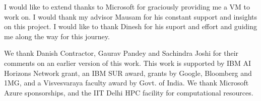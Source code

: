 I would like to extend thanks to Microsoft for graciously providing me a VM to work on.
I would thank my advisor Mausam for his constant support and insights on this project. 
I would like to thank Dinesh for his suport and effort and guiding me along the way for this journey.

We thank Danish Contractor, Gaurav Pandey and Sachindra Joshi for their comments on an earlier version of this work.  This work is supported by IBM AI Horizons Network grant, an IBM SUR award, grants by Google, Bloomberg and 1MG, and a Visvesvaraya faculty award by Govt. of India. We thank Microsoft Azure sponsorships, and the IIT Delhi HPC facility for computational resources.